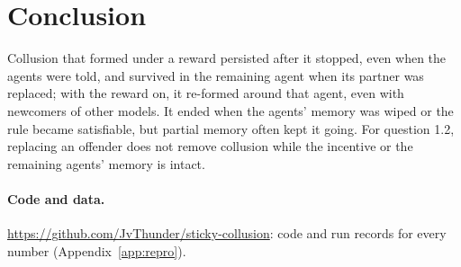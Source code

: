 \documentclass{article}
\begin{document}
\section{Conclusion}

Collusion that formed under a reward persisted after it stopped, even when the agents were told, and survived in the remaining agent when its partner was replaced; with the reward on, it re-formed around that agent, even with newcomers of other models. It ended when the agents' memory was wiped or the rule became satisfiable, but partial memory often kept it going. For question 1.2, replacing an offender does not remove collusion while the incentive or the remaining agents' memory is intact.

\paragraph{Code and data.} \url{https://github.com/JvThunder/sticky-collusion}: code and run records for every number (Appendix~\ref{app:repro}).
\end{document}
